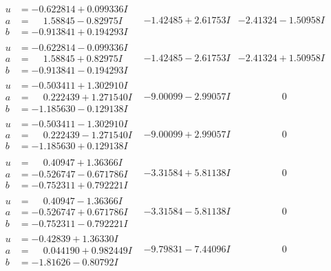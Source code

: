 \documentclass[1p]{elsarticle_modified}
\theoremstyle{definition}
\begin{document}
$$\begin{array}{c|c|c}
\begin{aligned}
u &= -0.622814 + 0.099336 I \\
a &= \phantom{-}1.58845 - 0.82975 I \\
b &= -0.913841 + 0.194293 I\end{aligned}
 & -1.42485 + 2.61753 I & -2.41324 - 1.50958 I \\ \hline\begin{aligned}
u &= -0.622814 - 0.099336 I \\
a &= \phantom{-}1.58845 + 0.82975 I \\
b &= -0.913841 - 0.194293 I\end{aligned}
 & -1.42485 - 2.61753 I & -2.41324 + 1.50958 I \\ \hline\begin{aligned}
u &= -0.503411 + 1.302910 I \\
a &= \phantom{-}0.222439 + 1.271540 I \\
b &= -1.185630 - 0.129138 I\end{aligned}
 & -9.00099 - 2.99057 I & \phantom{-0.000000 } 0 \\ \hline\begin{aligned}
u &= -0.503411 - 1.302910 I \\
a &= \phantom{-}0.222439 - 1.271540 I \\
b &= -1.185630 + 0.129138 I\end{aligned}
 & -9.00099 + 2.99057 I & \phantom{-0.000000 } 0 \\ \hline\begin{aligned}
u &= \phantom{-}0.40947 + 1.36366 I \\
a &= -0.526747 - 0.671786 I \\
b &= -0.752311 + 0.792221 I\end{aligned}
 & -3.31584 + 5.81138 I & \phantom{-0.000000 } 0 \\ \hline\begin{aligned}
u &= \phantom{-}0.40947 - 1.36366 I \\
a &= -0.526747 + 0.671786 I \\
b &= -0.752311 - 0.792221 I\end{aligned}
 & -3.31584 - 5.81138 I & \phantom{-0.000000 } 0 \\ \hline\begin{aligned}
u &= -0.42839 + 1.36330 I \\
a &= \phantom{-}0.044190 + 0.982449 I \\
b &= -1.81626 - 0.80792 I\end{aligned}
 & -9.79831 - 7.44096 I & \phantom{-0.000000 } 0 \\ \hline\begin{aligned}

\end{aligned}
\end{array}$$
\end{document}
